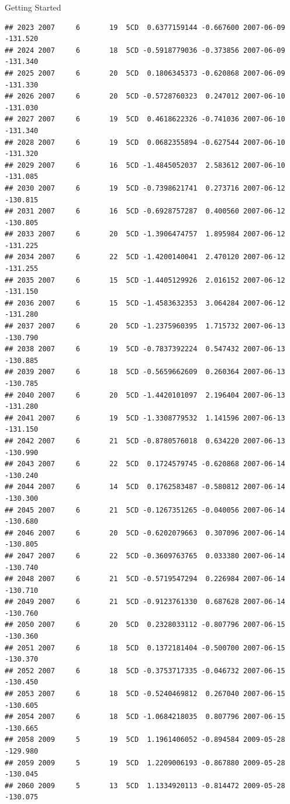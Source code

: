 \documentclass[
  ignorenonframetext,
]{beamer}
\begin{document}
\begin{frame}[fragile]{Getting Started}
\begin{verbatim}
## 2023 2007     6       19  5CD  0.6377159144 -0.667600 2007-06-09 -131.520
## 2024 2007     6       18  5CD -0.5918779036 -0.373856 2007-06-09 -131.340
## 2025 2007     6       20  5CD  0.1806345373 -0.620868 2007-06-09 -131.330
## 2026 2007     6       20  5CD -0.5728760323  0.247012 2007-06-10 -131.030
## 2027 2007     6       19  5CD  0.4618622326 -0.741036 2007-06-10 -131.340
## 2028 2007     6       19  5CD  0.0682355894 -0.627544 2007-06-10 -131.320
## 2029 2007     6       16  5CD -1.4845052037  2.583612 2007-06-10 -131.085
## 2030 2007     6       19  5CD -0.7398621741  0.273716 2007-06-12 -130.815
## 2031 2007     6       16  5CD -0.6928757287  0.400560 2007-06-12 -130.805
## 2033 2007     6       20  5CD -1.3906474757  1.895984 2007-06-12 -131.225
## 2034 2007     6       22  5CD -1.4200140041  2.470120 2007-06-12 -131.255
## 2035 2007     6       15  5CD -1.4405129926  2.016152 2007-06-12 -131.150
## 2036 2007     6       15  5CD -1.4583632353  3.064284 2007-06-12 -131.280
## 2037 2007     6       20  5CD -1.2375960395  1.715732 2007-06-13 -130.790
## 2038 2007     6       19  5CD -0.7837392224  0.547432 2007-06-13 -130.885
## 2039 2007     6       18  5CD -0.5659662609  0.260364 2007-06-13 -130.785
## 2040 2007     6       20  5CD -1.4420101097  2.196404 2007-06-13 -131.280
## 2041 2007     6       19  5CD -1.3308779532  1.141596 2007-06-13 -131.150
## 2042 2007     6       21  5CD -0.8780576018  0.634220 2007-06-13 -130.990
## 2043 2007     6       22  5CD  0.1724579745 -0.620868 2007-06-14 -130.240
## 2044 2007     6       14  5CD  0.1762583487 -0.580812 2007-06-14 -130.300
## 2045 2007     6       21  5CD -0.1267351265 -0.040056 2007-06-14 -130.680
## 2046 2007     6       20  5CD -0.6202079663  0.307096 2007-06-14 -130.805
## 2047 2007     6       22  5CD -0.3609763765  0.033380 2007-06-14 -130.740
## 2048 2007     6       21  5CD -0.5719547294  0.226984 2007-06-14 -130.710
## 2049 2007     6       21  5CD -0.9123761330  0.687628 2007-06-14 -130.760
## 2050 2007     6       20  5CD  0.2328033112 -0.807796 2007-06-15 -130.360
## 2051 2007     6       18  5CD  0.1372181404 -0.500700 2007-06-15 -130.370
## 2052 2007     6       18  5CD -0.3753717335 -0.046732 2007-06-15 -130.450
## 2053 2007     6       18  5CD -0.5240469812  0.267040 2007-06-15 -130.605
## 2054 2007     6       18  5CD -1.0684218035  0.807796 2007-06-15 -130.665
## 2058 2009     5       19  5CD  1.1961406052 -0.894584 2009-05-28 -129.980
## 2059 2009     5       19  5CD  1.2209006193 -0.867880 2009-05-28 -130.045
## 2060 2009     5       13  5CD  1.1334920113 -0.814472 2009-05-28 -130.075

\end{verbatim}
\end{frame}
\end{document}
